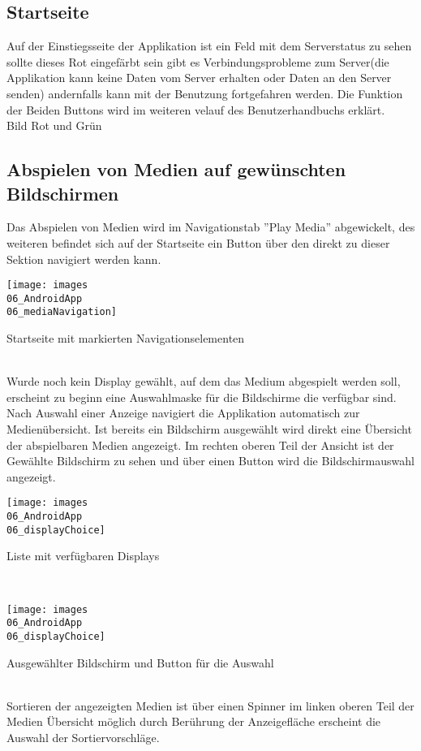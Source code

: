 \subsection{Startseite}
Auf der Einstiegsseite der Applikation ist ein Feld mit dem Serverstatus zu sehen sollte dieses Rot eingefärbt sein gibt es Verbindungsprobleme zum Server(die Applikation kann keine Daten vom Server erhalten oder Daten an den Server senden) andernfalls kann mit der Benutzung fortgefahren werden. Die Funktion der Beiden Buttons wird im weiteren velauf des Benutzerhandbuchs erklärt.
\\
Bild Rot und Grün
\\
\subsection{Abspielen von Medien auf gewünschten Bildschirmen}
Das Abspielen von Medien wird im Navigationstab ''Play Media'' abgewickelt, des weiteren befindet sich auf der Startseite ein Button über den direkt zu dieser Sektion navigiert werden kann.
\\
\begin{mediaNav}
\centering
\texttt{[image: images\\06\_AndroidApp\\06\_mediaNavigation]}
\caption{Startseite mit markierten Navigationselementen}
\label{fig:mediaNav}
\end{mediaNav}
\\
Wurde noch kein Display gewählt, auf dem das Medium abgespielt werden soll, erscheint zu beginn eine Auswahlmaske für die Bildschirme die verfügbar sind. Nach Auswahl einer Anzeige navigiert die Applikation automatisch zur Medienübersicht. Ist bereits ein Bildschirm ausgewählt wird direkt eine Übersicht der abspielbaren Medien angezeigt. Im rechten oberen Teil der Ansicht ist der Gewählte Bildschirm zu sehen und über einen Button wird die Bildschirmauswahl angezeigt.
\\
\begin{dispChoi}
\centering
\texttt{[image: images\\06\_AndroidApp\\06\_displayChoice]}
\caption{Liste mit verfügbaren Displays}
\label{fig:mediaNav}
\end{dispChoi}
\\
\begin{dispBut}
\centering
\texttt{[image: images\\06\_AndroidApp\\06\_displayChoice]}
\caption{Ausgewählter Bildschirm und Button für die Auswahl}
\label{fig:mediaNav}
\end{dispBut}
\\
Sortieren der angezeigten Medien ist über einen Spinner im linken oberen Teil der Medien Übersicht möglich durch Berührung der Anzeigefläche erscheint die Auswahl der Sortiervorschläge.
